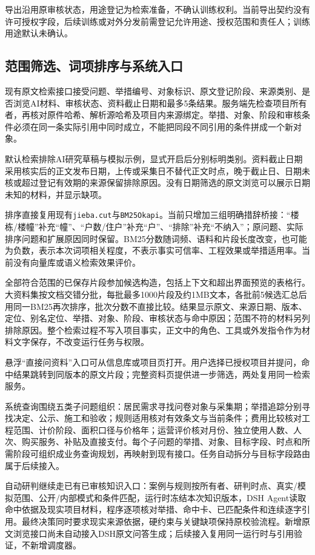 导出沿用原审核状态，用途登记为检索准备，不确认训练权利。当前导出契约没有许可授权字段，后续训练或对外分发前需登记允许用途、授权范围和责任人；训练用途默认未确认。

\subsection{范围筛选、词项排序与系统入口}

现有原文检索接口接受问题、举措编号、对象标识、原文登记阶段、来源类别、是否浏览AI材料、审核状态、资料截止日期和最多5条结果。服务端先检查项目所有者，再核对原件哈希、解析源哈希及项目内来源绑定。举措、对象、阶段和审核条件必须在同一条实际引用中同时成立，不能把同段不同引用的条件拼成一个新对象。

默认检索排除AI研究草稿与模拟示例，显式开启后分别标明类别。资料截止日期采用核实后的正文发布日期，上传或采集日不替代正文时点，晚于截止日、日期未核或超过登记有效期的来源保留排除原因。没有日期筛选的原文浏览可以展示日期未知的材料，并显示缺项。

排序直接复用现有\texttt{jieba.cut}与\texttt{BM25Okapi}。当前只增加三组明确措辞桥接：“楼栋/楼幢”补充“幢”、“户数/住户”补充“户”、“排除”补充“不纳入”；原问题、实际排序问题和扩展原因同时保留。BM25分数随词频、语料和片段长度改变，也可能为负数，表示本次词项相关程度，不表示事实可信率、工程效果或举措适用率。当前没有向量库或语义检索效果评价。

全部符合范围的已保存片段参加候选构造，包括上下文和超出界面预览的表格行。大资料集按文档交错分批，每批最多1000片段及约1MB文本，各批前5候选汇总后用同一BM25再次排序，批次分数不直接比较。结果显示原文、来源日期、版本、定位、别名定位、举措、对象、阶段、审核状态与命中原因；范围不符的材料另列排除原因。整个检索过程不写入项目事实，正文中的角色、工具或外发指令作为材料文字保存，不改变运行任务与权限。

悬浮“直接问资料”入口可从信息库或项目页打开。用户选择已授权项目并提问，命中结果跳转到同版本的原文片段；完整资料页提供进一步筛选，两处复用同一检索服务。

系统查询围绕五类子问题组织：居民需求寻找问卷对象与采集期；举措追踪分别寻找决定、公示、施工和验收；规则适用核对有效条文与当前条件；费用比较核对工程范围、计价阶段、面积口径与价格年；运营评价核对月份、独立使用人数、人次、购买服务、补贴及直接支付。每个子问题的举措、对象、目标字段、时点和所需阶段可组织成业务查询规划，再映射到现有接口。任务自动拆分与目标字段路由属于后续接入。

自动研判继续走已有已审核知识入口：案例与规则按所有者、研判时点、真实/模拟范围、公开/内部模式和条件匹配，运行时冻结本次知识版本，DSH Agent读取命中依据及现实项目材料，程序逐项核对举措、命中卡、已匹配条件和连续逐字引用。最终决策同时要求现实来源依据，硬约束与关键缺项保持原校验流程。新增原文浏览接口尚未自动接入DSH原文问答生成；后续接入复用同一运行时与引用验证，不新增调度器。

